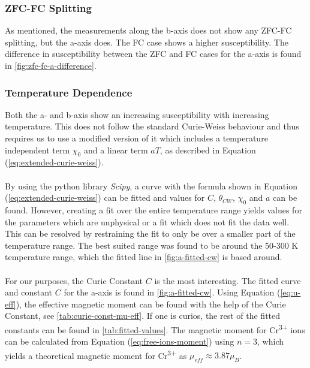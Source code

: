     \subsubsection{ZFC-FC Splitting}
    As mentioned, the measurements along the b-axis does not show any ZFC-FC splitting, but the a-axis does. The FC case shows a higher susceptibility. 
    The difference in susceptibility between the ZFC and FC cases for the a-axis is found in \autoref{fig:zfc-fc-a-difference}.
    \subsubsection{Temperature Dependence}
    Both the a- and b-axis show an increasing susceptibility with increasing temperature. This does not follow the standard Curie-Weiss behaviour and 
    thus requires us to use a modified version of it which includes a temperature independent term $\chi_0$ and a linear term $aT$, as described in 
    Equation (\ref{eq:extended-curie-weiss}).
    \\ \\
    By using the python library \textit{Scipy}, a curve with the formula shown in Equation (\ref{eq:extended-curie-weiss}) can be fitted and values 
    for $C$, $\theta_{CW}$, $\chi_0$ and $a$ can be found. However, creating a fit over the entire temperature range yields values for the parameters 
    which are unphysical or a fit which does not fit the data well. This can be resolved by restraining the fit to only be over a smaller part of the 
    temperature range. The best suited range was found to be around the 50-300 K temperature range, which the fitted line in \autoref{fig:a-fitted-cw} 
    is based around.
    \\ \\
    For our purposes, the Curie Constant $C$ is the most interesting. The fitted curve and constant $C$ for the a-axis is found in 
    \autoref{fig:a-fitted-cw}. Using Equation (\ref{eq:u-eff}), the effective magnetic moment can be found with the help of the Curie Constant, 
    see \autoref{tab:curie-const-mu-eff}. If one is curios, the rest of the fitted constants can be found in \autoref{tab:fitted-values}. 
    The magnetic moment for Cr\textsuperscript{3+} ions can be calculated from Equation (\ref{eq:free-ions-moment}) 
    using $n=3$, which yields a theoretical magnetic moment for Cr\textsuperscript{3+} as $\mu_{eff}\approx3.87\mu_B$. 
    
    
    

